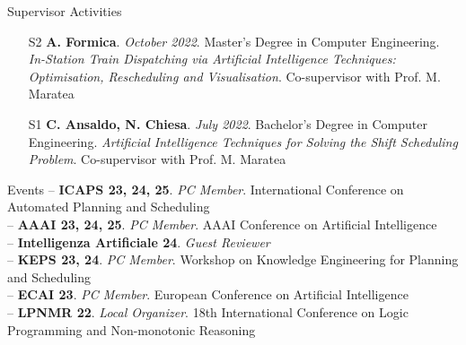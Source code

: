 \documentclass{resume} %
\begin{document}
\pagebreak
\begin{rSection}{Supervisor Activities}
\begin{enumerate}[leftmargin=5mm]
	\item[S2] \textbf{A. Formica}. \textit{October 2022}. Master's Degree in Computer Engineering. \textit{In-Station Train Dispatching via Artificial Intelligence Techniques: Optimisation, Rescheduling and Visualisation}. Co-supervisor with Prof. M. Maratea 
	\item[S1] \textbf{C. Ansaldo, N. Chiesa}. \textit{July 2022}. Bachelor's Degree in Computer Engineering. \textit{Artificial Intelligence Techniques for Solving the Shift Scheduling Problem}. Co-supervisor with Prof. M. Maratea
\end{enumerate}
\end{rSection}



\begin{rSection}{Events}
-- \textbf{ICAPS 23, 24, 25}. \textit{PC Member}. International Conference on Automated Planning and Scheduling \\
-- \textbf{AAAI 23, 24, 25}. \textit{PC Member}. AAAI Conference on Artificial Intelligence \\
-- \textbf{Intelligenza Artificiale 24}. \textit{Guest Reviewer} \\
-- \textbf{KEPS 23, 24}. \textit{PC Member}. Workshop on Knowledge Engineering for Planning and Scheduling \\
-- \textbf{ECAI 23}. \textit{PC Member}. European Conference on Artificial Intelligence \\
-- \textbf{LPNMR 22}. \textit{Local Organizer}. 18th International Conference on Logic Programming and Non-monotonic Reasoning  
\end{rSection}


%
%
%
\end{document}
